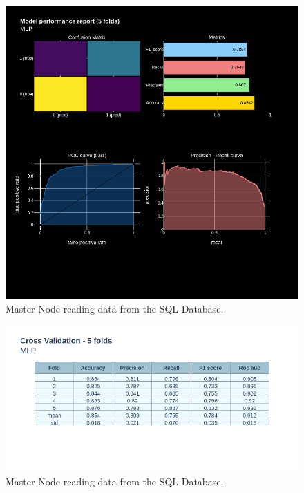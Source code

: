 \documentclass[12pt]{article}
\begin{document}
\begin{figure}[ht]
\centering
\includegraphics[width=1\textwidth]{newplot(43).png}
\caption{Master Node reading data from the SQL Database.}
\end{figure}

\begin{figure}[ht]
\centering
\includegraphics[width=1\textwidth]{newplot(44).png}
\caption{Master Node reading data from the SQL Database.}
\end{figure}
\end{document}
